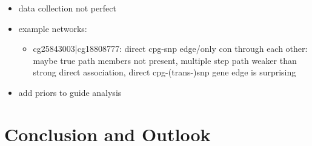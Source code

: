 \documentclass[a4paper,12pt,twoside,openright]{report}
\begin{document}
\begin{itemize}
\item data collection not perfect
\item example networks:
\begin{itemize}
\item cg25843003|cg18808777: direct cpg-snp edge/only con through each other: maybe true path members not  present, multiple step path weaker than strong direct association, direct cpg-(trans-)snp gene edge is surprising
\end{itemize}
\item add priors to guide analysis 
\end{itemize}


\newpage
\chapter{Conclusion and Outlook}
\label{Conclusion and Outlook}

\newpage
\listoffigures
\listoftables

{}

\end{document}
